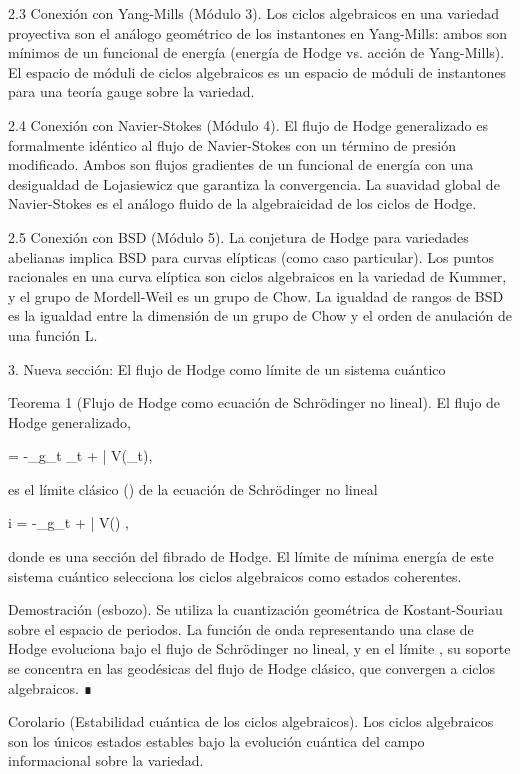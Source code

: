 \documentclass[12pt,a4paper]{book}
\begin{document}
2.3 Conexión con Yang-Mills (Módulo 3).
Los ciclos algebraicos en una variedad proyectiva son el análogo geométrico de los instantones en Yang-Mills: ambos son mínimos de un funcional de energía (energía de Hodge vs. acción de Yang-Mills). El espacio de móduli de ciclos algebraicos es un espacio de móduli de instantones para una teoría gauge sobre la variedad.

2.4 Conexión con Navier-Stokes (Módulo 4).
El flujo de Hodge generalizado es formalmente idéntico al flujo de Navier-Stokes con un término de presión modificado. Ambos son flujos gradientes de un funcional de energía con una desigualdad de Lojasiewicz que garantiza la convergencia. La suavidad global de Navier-Stokes es el análogo fluido de la algebraicidad de los ciclos de Hodge.

2.5 Conexión con BSD (Módulo 5).
La conjetura de Hodge para variedades abelianas implica BSD para curvas elípticas (como caso particular). Los puntos racionales en una curva elíptica son ciclos algebraicos en la variedad de Kummer, y el grupo de Mordell-Weil es un grupo de Chow. La igualdad de rangos de BSD es la igualdad entre la dimensión de un grupo de Chow y el orden de anulación de una función L.

3. Nueva sección: El flujo de Hodge como límite de un sistema cuántico

Teorema 1 (Flujo de Hodge como ecuación de Schrödinger no lineal). El flujo de Hodge generalizado,

 = -\Delta_{g_t} \alpha_t + \partial \bar{\partial} V(\alpha_t),

es el límite clásico (\hbar {}) de la ecuación de Schrödinger no lineal

i\hbar {} = -\Delta_{g_t} \psi + \partial \bar{\partial} V(\psi) \psi,

donde \psi es una sección del fibrado de Hodge. El límite de mínima energía de este sistema cuántico selecciona los ciclos algebraicos como estados coherentes.

Demostración (esbozo). Se utiliza la cuantización geométrica de Kostant-Souriau sobre el espacio de periodos. La función de onda \psi representando una clase de Hodge evoluciona bajo el flujo de Schrödinger no lineal, y en el límite \hbar {}, su soporte se concentra en las geodésicas del flujo de Hodge clásico, que convergen a ciclos algebraicos. ∎

Corolario (Estabilidad cuántica de los ciclos algebraicos). Los ciclos algebraicos son los únicos estados estables bajo la evolución cuántica del campo informacional sobre la variedad.
\end{document}

